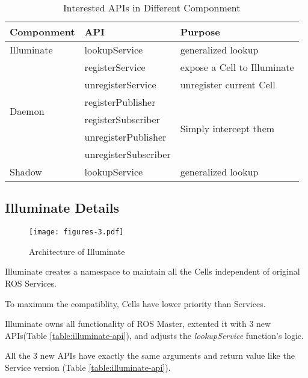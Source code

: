 \begin{table}
    \renewcommand{\arraystretch}{1.3}
    \caption{Interested APIs in Different Componment}
    \label{table:interested-apis}
    \centering
    \begin{tabular}{|l|l|l|}
        \hline
        \bfseries Componment & \bfseries  API & \bfseries Purpose \\
        \hline
        \multirow{1}{*}{Illuminate} & lookupService & generalized lookup \\
        \hline
        \multirow{6}{*}{Daemon} & registerService & expose a Cell to Illuminate\\
        \cline{2-3} & unregisterService & unregister current Cell \\
        \cline{2-3} & registerPublisher & \multirow{4}{*}{Simply intercept them} \\
        \cline{2-2} & registerSubscriber    &  \\
        \cline{2-2} & unregisterPublisher   &  \\
        \cline{2-2} & unregisterSubscriber  &  \\
        \hline
        \multirow{1}{*}{Shadow} & lookupService & generalized lookup \\
        \hline
    \end{tabular}
\end{table} 

\subsection{Illuminate Details}

\begin{figure}[!t]
\centering
\texttt{[image: figures-3.pdf]}
\caption{Architecture of Illuminate}
\label{figure:aoil}
\end{figure}

Illuminate creates a namespace to maintain all the Cells independent of
original ROS Services.

To maximum the compatiblity, Cells have lower priority than Services.

Illuminate owns all functionality of ROS Master,
extented it with 3 new APIs(Table \ref{table:illuminate-api}),
and adjusts the \emph{lookupService} function's logic.

All the 3 new APIs have exactly the same arguments and
return value like the Service version (Table \ref{table:illuminate-api}).


